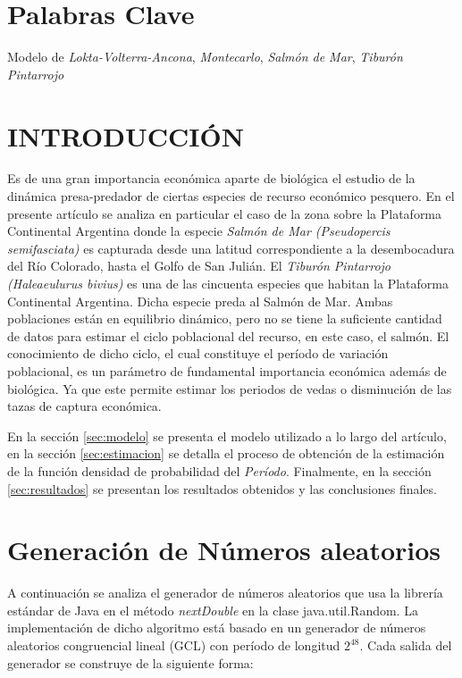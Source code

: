 \documentclass{SPANISH_acm_proc_article-sp}
\begin{document}
\section*{Palabras Clave}
Modelo de \textit{Lokta-Volterra-Ancona}, \textit{Montecarlo}, \textit{Salm\'on de Mar},
\textit{Tibur\'on Pintarrojo}

\section{INTRODUCCI\'ON}
Es de una gran importancia econ\'omica aparte de biol\'ogica el estudio de la din\'amica
presa-predador de ciertas especies de recurso econ\'omico pesquero. En el presente art\'iculo
se analiza en particular el caso de la zona sobre la Plataforma Continental Argentina donde
la especie \emph{Salm\'on de Mar (Pseudopercis semifasciata)} es capturada desde una
latitud correspondiente a la desembocadura del R\'io Colorado, hasta el Golfo de San Juli\'an.
El \emph{Tibur\'on Pintarrojo (Haleaeulurus bivius)} es una de las cincuenta especies que
habitan la Plataforma Continental Argentina. Dicha especie preda al Salm\'on de Mar.
Ambas poblaciones est\'an en equilibrio din\'amico, pero no se tiene la suficiente 
cantidad de datos para estimar el ciclo poblacional del recurso, en este caso, el salm\'on.
El conocimiento de dicho ciclo, el cual constituye el per\'iodo de variaci\'on poblacional,
es un par\'ametro de fundamental importancia econ\'omica adem\'as de biol\'ogica. Ya que
este permite estimar los periodos de vedas o disminuci\'on de las tazas de captura
econ\'omica.

En la secci\'on \ref{sec:modelo} se presenta el modelo utilizado a lo largo del art\'iculo,
en la secci\'on \ref{sec:estimacion} se detalla el proceso de obtenci\'on de la
estimaci\'on de la funci\'on densidad de probabilidad del \emph{Per\'iodo}. Finalmente,
en la secci\'on \ref{sec:resultados} se presentan los resultados obtenidos y las
conclusiones finales.

\section{Generaci\'on de N\'umeros aleatorios}
A continuaci\'on se analiza el generador de n\'umeros aleatorios que usa la librer\'ia est\'andar
de Java en el m\'etodo \textit{nextDouble} en la clase java.util.Random. La implementaci\'on de dicho 
algoritmo est\'a basado en un generador de n\'umeros aleatorios congruencial lineal (GCL) con per\'iodo
de longitud $2^{48}$. Cada salida del generador se construye de la siguiente forma:
\end{document}
